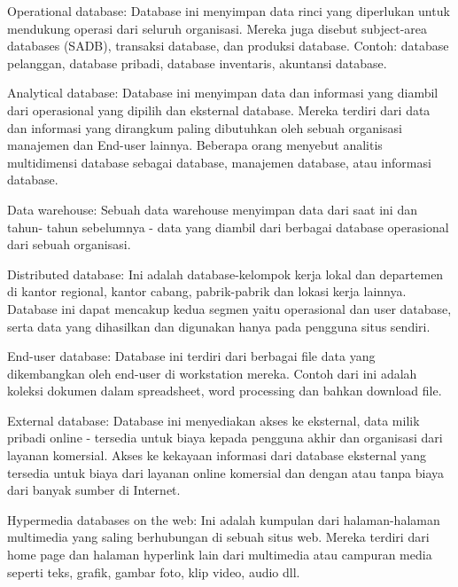 \documentclass{wileySix}
\begin{document}
\begin{myEnumerate}
	\item Operational database: Database ini menyimpan data rinci yang diperlukan untuk mendukung operasi dari seluruh organisasi. Mereka juga disebut subject-area databases (SADB), transaksi database, dan produksi database. Contoh: database pelanggan, database pribadi, database inventaris, akuntansi database. \par
	\noindent 
	\item Analytical database: Database ini menyimpan data dan informasi yang diambil dari operasional yang dipilih dan eksternal database. Mereka terdiri dari data dan informasi yang dirangkum paling dibutuhkan oleh sebuah organisasi manajemen dan End-user lainnya. Beberapa orang menyebut analitis multidimensi database sebagai database, manajemen database, atau informasi database. \par
	\noindent 
	\item Data warehouse: Sebuah data warehouse menyimpan data dari saat ini dan tahun- tahun sebelumnya - data yang diambil dari berbagai database operasional dari sebuah organisasi. \par
	\noindent 
	\item Distributed database: Ini adalah database-kelompok kerja lokal dan departemen di kantor regional, kantor cabang, pabrik-pabrik dan lokasi kerja lainnya. Database ini dapat mencakup kedua segmen yaitu operasional dan user database, serta data yang dihasilkan dan digunakan hanya pada pengguna situs sendiri. \par
	\noindent 
	\item End-user database: Database ini terdiri dari berbagai file data yang dikembangkan oleh end-user di workstation mereka. Contoh dari ini adalah koleksi dokumen dalam spreadsheet, word processing dan bahkan download file. \par
	\noindent 
	\item External database: Database ini menyediakan akses ke eksternal, data milik pribadi online - tersedia untuk biaya kepada pengguna akhir dan organisasi dari layanan komersial. Akses ke kekayaan informasi dari database eksternal yang tersedia untuk biaya dari layanan online komersial dan dengan atau tanpa biaya dari banyak sumber di Internet. \par
	\noindent 
	\item Hypermedia databases on the web: Ini adalah kumpulan dari halaman-halaman multimedia yang saling berhubungan di sebuah situs web. Mereka terdiri dari home page dan halaman hyperlink lain dari multimedia atau campuran media seperti teks, grafik, gambar foto, klip video, audio dll. \par

\end{myEnumerate}
\end{document}
